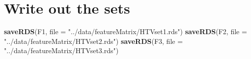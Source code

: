 \documentclass[10pt]{report}
\newenvironment{Shaded}{}{}
\newcommand{\KeywordTok}[1]{\textcolor[rgb]{0.00,0.44,0.13}{\textbf{{#1}}}}
\newcommand{\DataTypeTok}[1]{\textcolor[rgb]{0.56,0.13,0.00}{{#1}}}
\newcommand{\StringTok}[1]{\textcolor[rgb]{0.25,0.44,0.63}{{#1}}}
\newcommand{\NormalTok}[1]{{#1}}
\begin{document}
\section{Write out the sets}\label{write-out-the-sets}

\begin{Shaded}
\begin{Highlighting}[]
\KeywordTok{saveRDS}\NormalTok{(F1, }\DataTypeTok{file =} \StringTok{"../data/featureMatrix/HTVset1.rds"}\NormalTok{)}
\KeywordTok{saveRDS}\NormalTok{(F2, }\DataTypeTok{file =} \StringTok{"../data/featureMatrix/HTVset2.rds"}\NormalTok{)}
\KeywordTok{saveRDS}\NormalTok{(F3, }\DataTypeTok{file =} \StringTok{"../data/featureMatrix/HTVset3.rds"}\NormalTok{)}
\end{Highlighting}
\end{Shaded}
\end{document}
